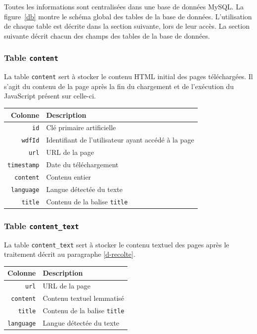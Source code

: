 		Toutes les informations sont centralisées dans une base de données MySQL. La figure~\ref{db} montre le schéma global des tables de la base de données. L'utilisation de chaque table est décrite dans la section suivante, lors de leur accès. La section suivante décrit chacun des champs des tables de la base de données.

		\subsubsection{Table \texttt{content}}\label{table-content}
			La table \texttt{content} sert à stocker le contenu HTML initial des pages téléchargées. Il s'agit du contenu  de la page après la fin du chargement et de l'exécution du JavaScript présent sur celle-ci.

			\begin{tabular}{rl}
				\textbf{Colonne} & \textbf{Description} \\
				\hline
				\texttt{id}       & Clé primaire artificielle \\
				\texttt{wdfId}    & Identifiant de l'utilisateur ayant accédé à la page \\
				\texttt{url}      & URL de la page \\
				\texttt{timestamp} & Date du téléchargement \\
				\texttt{content}  & Contenu \glsdisp{DOM}{DOM} entier \\
				\texttt{language} & Langue détectée du texte \\
				\texttt{title}    & Contenu de la balise \texttt{\small{title}} \\
			\end{tabular}
		
		\subsubsection{Table \texttt{content\_text}}\label{table-content-text}
			La table \texttt{content\_text} sert à stocker le contenu textuel des pages après le traitement décrit au paragraphe \ref{d-recolte}.

			\begin{tabular}{rl}
				\textbf{Colonne} & \textbf{Description} \\
				\hline
			    \texttt{url}      & URL de la page \\
				\texttt{content}  & Contenu textuel lemmatisé \\
				\texttt{title}    & Contenu de la balise \texttt{\small{title}} \\
				\texttt{language} & Langue détectée du texte \\
			\end{tabular}
		
